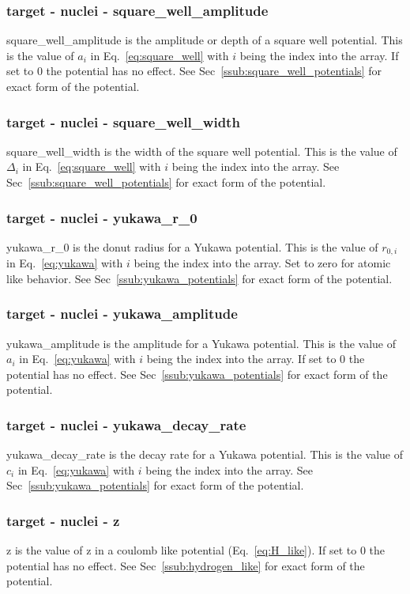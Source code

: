 \documentclass{article}
\begin{document}
\subsubsection{target - nuclei - square\_well\_amplitude}
square\_well\_amplitude is the amplitude or depth of a square well potential. This is the value of $a_i$ in Eq.~\ref{eq:square_well} with $i$ being the index into the array. If set to 0 the potential has no effect. See Sec~\ref{ssub:square_well_potentials} for exact form of the potential.

\subsubsection{target - nuclei - square\_well\_width}
square\_well\_width is the width of the square well potential. This is the value of $\Delta_i$ in Eq.~\ref{eq:square_well} with $i$ being the index into the array. See Sec~\ref{ssub:square_well_potentials} for exact form of the potential.

\subsubsection{target - nuclei - yukawa\_r\_0}
yukawa\_r\_0 is the donut radius for a Yukawa potential. This is the value of $r_{0,i}$ in Eq.~\ref{eq:yukawa} with $i$ being the index into the array. Set to zero for atomic like behavior. See Sec~\ref{ssub:yukawa_potentials} for exact form of the potential.

\subsubsection{target - nuclei - yukawa\_amplitude}
yukawa\_amplitude is the amplitude for a Yukawa potential. This is the value of $a_i$ in Eq.~\ref{eq:yukawa} with $i$ being the index into the array. If set to 0 the potential has no effect. See Sec~\ref{ssub:yukawa_potentials} for exact form of the potential.

\subsubsection{target - nuclei - yukawa\_decay\_rate}
yukawa\_decay\_rate is the decay rate for a Yukawa potential. This is the value of $c_i$ in Eq.~\ref{eq:yukawa} with $i$ being the index into the array. See Sec~\ref{ssub:yukawa_potentials} for exact form of the potential.

\subsubsection{target - nuclei - z}
z is the value of z in a coulomb like potential (Eq.~\ref{eq:H_like}). If set to 0 the potential has no effect. See Sec~\ref{ssub:hydrogen_like} for exact form of the potential.
\end{document}
